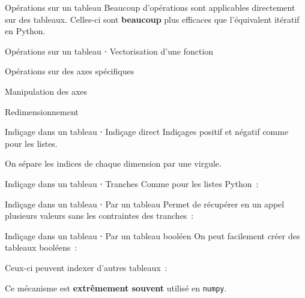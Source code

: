 \begin{frame}{Opérations sur un tableau}
  Beaucoup d'opérations sont applicables directement sur des tableaux. Celles-ci sont \textbf{beaucoup} plus efficaces que l'équivalent itératif en Python.
\end{frame}

\begin{frame}{Opérations sur un tableau ⋅ Vectorisation d'une fonction}
\end{frame}

\begin{frame}{Opérations sur des axes spécifiques}
\end{frame}

\begin{frame}{Manipulation des axes}
\end{frame}

\begin{frame}{Redimensionnement}
\end{frame}

\begin{frame}{Indiçage dans un tableau ⋅ Indiçage direct}
  Indiçages positif et négatif comme pour les listes.

  On sépare les indices de chaque dimension par une virgule.

\end{frame}

\begin{frame}{Indiçage dans un tableau ⋅ Tranches}
  Comme pour les listes Python~:
\end{frame}

\begin{frame}{Indiçage dans un tableau ⋅ Par un tableau}
  Permet de récupérer en un appel plusieurs valeurs sans les contraintes des tranches~:
\end{frame}

\begin{frame}{Indiçage dans un tableau ⋅ Par un tableau booléen}
  On peut facilement créer des tableaux booléens~:

  Ceux-ci peuvent indexer d'autres tableaux~:

  Ce mécanisme est \textbf{extrêmement souvent} utilisé en \texttt{numpy}.
\end{frame}


